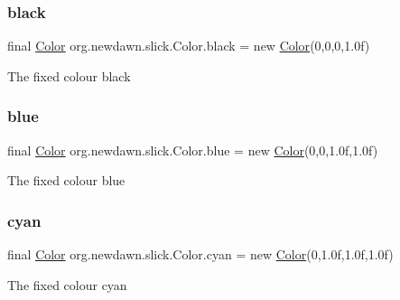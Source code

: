\subsubsection{\texorpdfstring{black}{black}}
{\footnotesize\ttfamily final \mbox{\hyperlink{classorg_1_1newdawn_1_1slick_1_1_color}{Color}} org.\+newdawn.\+slick.\+Color.\+black = new \mbox{\hyperlink{classorg_1_1newdawn_1_1slick_1_1_color}{Color}}(0,0,0,1.\+0f)\hspace{0.3cm}{\ttfamily [static]}}

The fixed colour black \mbox{\label{classorg_1_1newdawn_1_1slick_1_1_color_af55c4f4e0af464d15cf85939058f4567}} 
\subsubsection{\texorpdfstring{blue}{blue}}
{\footnotesize\ttfamily final \mbox{\hyperlink{classorg_1_1newdawn_1_1slick_1_1_color}{Color}} org.\+newdawn.\+slick.\+Color.\+blue = new \mbox{\hyperlink{classorg_1_1newdawn_1_1slick_1_1_color}{Color}}(0,0,1.\+0f,1.\+0f)\hspace{0.3cm}{\ttfamily [static]}}

The fixed colour blue \mbox{\label{classorg_1_1newdawn_1_1slick_1_1_color_ae296d247f4920ee8be313168843d4710}} 
\subsubsection{\texorpdfstring{cyan}{cyan}}
{\footnotesize\ttfamily final \mbox{\hyperlink{classorg_1_1newdawn_1_1slick_1_1_color}{Color}} org.\+newdawn.\+slick.\+Color.\+cyan = new \mbox{\hyperlink{classorg_1_1newdawn_1_1slick_1_1_color}{Color}}(0,1.\+0f,1.\+0f,1.\+0f)\hspace{0.3cm}{\ttfamily [static]}}

The fixed colour cyan \mbox{\label{classorg_1_1newdawn_1_1slick_1_1_color_a3041c0509804a86fa409b21b832ad2d2}} 
